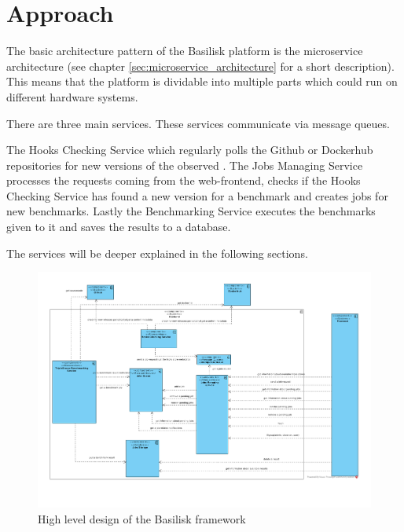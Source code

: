 \chapter{Approach}
\label{ch:approach}


The basic architecture pattern of the Basilisk platform is the microservice architecture (see chapter \ref{sec:microservice_architecture} for a short description). 
This means that the platform is dividable into multiple parts which could run on different hardware systems.

There are three main services.
These services communicate via message queues.


The Hooks Checking Service which regularly polls the Github or Dockerhub repositories for new versions of the observed \tsp{}.
The Jobs Managing Service processes the requests coming from the web-frontend, checks if the Hooks Checking Service has found a new version for a benchmark and creates jobs for new benchmarks.
Lastly the \ts{} Benchmarking Service executes the benchmarks given to it and saves the results to a database.

The services will be deeper explained in the following sections.



\begin{figure}[tbph]
	\centering
	\includegraphics[width=1.1\textwidth]{figures/basilisk_high_level_design.pdf}
	\caption{High level design of the Basilisk framework}
	\label{fig:basilisk_high_level_design}
\end{figure}
